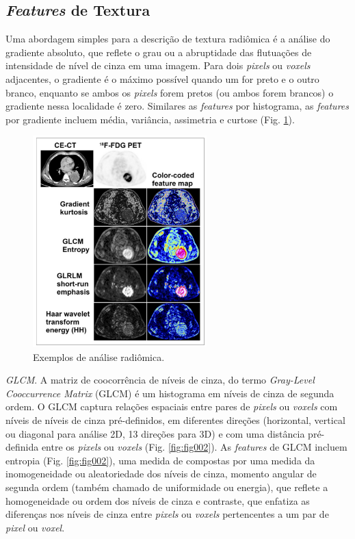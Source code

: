 \subsection{\textit{Features} de Textura}

Uma abordagem simples para a descrição de textura radiômica é a análise do gradiente absoluto, que reflete o grau ou a abruptidade das flutuações de intensidade de nível de cinza em uma imagem. Para dois \textit{pixels} ou \textit{voxels} adjacentes, o gradiente é o máximo possível quando um for preto e o outro branco, enquanto se ambos os \textit{pixels} forem pretos (ou ambos forem brancos) o gradiente nessa localidade é zero. Similares as \textit{features} por histograma, as \textit{features} por gradiente incluem média, variância, assimetria e curtose (Fig. \ref{fig:fig001}).

\captionsetup{justification=centering}
\begin{figure}[htbp]
    \centering
    \includegraphics[width=0.6\textwidth]{figures/fig001.png}
    \caption{Exemplos de análise radiômica.}
    \label{fig:fig001}
\end{figure}

 \textit{GLCM}. A matriz de coocorrência de níveis de cinza, do termo \textit{Gray-Level Cooccurrence Matrix} (GLCM) é um histograma em níveis de cinza de segunda ordem. O GLCM captura relações espaciais entre pares de \textit{pixels} ou \textit{voxels} com níveis de níveis de cinza pré-definidos, em diferentes direções (horizontal, vertical ou diagonal para análise 2D, 13 direções para 3D) e com uma distância pré-definida entre os \textit{pixels} ou \textit{voxels} (Fig. \ref{fig:fig002}). As \textit{features} de GLCM incluem entropia (Fig. \ref{fig:fig002}), uma medida de  compostas por uma medida da inomogeneidade ou aleatoriedade dos níveis de cinza, momento angular de segunda ordem (também chamado de uniformidade ou energia), que reflete a homogeneidade ou ordem dos níveis de cinza e contraste, que enfatiza as diferenças nos níveis de cinza entre \textit{pixels} ou \textit{voxels} pertencentes a um par de \textit{pixel} ou \textit{voxel}.

